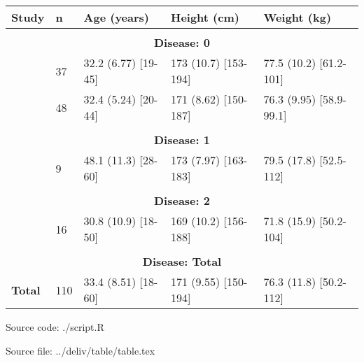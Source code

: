 \documentclass[varwidth, border={10 5 50 5}]{standalone}
\begin{document}
\begin{tabular}{lllll}
  \hline
 {\bfseries Study } & {\bfseries n } & {\bfseries Age (years) } & {\bfseries Height (cm) } & {\bfseries Weight (kg) } \\ \hline
\multicolumn{5}{c}{}\\ \multicolumn{5}{c}{{\bfseries Disease: 0}}\\ \hline
 \quad 390         & 37  & 32.2 (6.77) [19-45] & 173 (10.7) [153-194] & 77.5 (10.2) [61.2-101]  \\
 \quad 620         & 48  & 32.4 (5.24) [20-44] & 171 (8.62) [150-187] & 76.3 (9.95) [58.9-99.1] \\ \hline
\multicolumn{5}{c}{}\\ \multicolumn{5}{c}{{\bfseries Disease: 1}}\\ \hline
 \quad 620         & 9   & 48.1 (11.3) [28-60] & 173 (7.97) [163-183] & 79.5 (17.8) [52.5-112]  \\ \hline
\multicolumn{5}{c}{}\\ \multicolumn{5}{c}{{\bfseries Disease: 2}}\\ \hline
 \quad 183         & 16  & 30.8 (10.9) [18-50] & 169 (10.2) [156-188] & 71.8 (15.9) [50.2-104]  \\ \hline
\multicolumn{5}{c}{}\\ \multicolumn{5}{c}{{\bfseries Disease: Total}}\\ \hline
 {\bfseries Total} & 110 & 33.4 (8.51) [18-60] & 171 (9.55) [150-194] & 76.3 (11.8) [50.2-112]  \\ \hline
\end{tabular}
 
{\raggedleft \tiny Source code: ./script.R}
 
\vspace{-5pt}
{\raggedleft \tiny Source file: ../deliv/table/table.tex}
\end{document}
